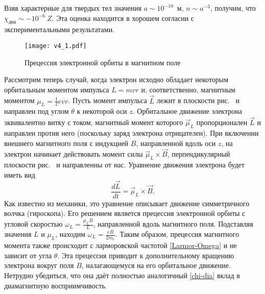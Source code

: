 Взяв характерные для твердых тел значения
$a \sim 10^{-10}$~м, $n\sim a^{-3}$, получим,
что $\chi_{диа} \sim -10^{-6}~Z$.
Эта оценка находится в хорошем согласии с экспериментальными результатами.

\begin{wrapfigure}[15]{r}{0.3\textwidth}
\centering
\texttt{[image: v4\_1.pdf]}
\caption{Прецессия электронной орбиты в магнитном поле}
\end{wrapfigure}

Рассмотрим теперь случай, когда электрон исходно обладает некоторым
орбитальным моментом импульса $L=mvr$ и, соответственно,
магнитным моментом $\mu_L= \frac12 e v r$.
Пусть момент импульса $\vec{L}$ лежит в плоскости
рис.~ и направлен под углом $\theta$ к некоторой оси $z$.
Орбитальное движение электрона эквивалентно витку с током,
магнитный момент которого $\vec{\mu}_L$ пропорционален $\vec{L}$
и направлен против него (поскольку заряд электрона отрицателен).
При включении внешнего магнитного поля с индукцией $B$,
направленной вдоль оси $z$, на электрон начинает
действовать момент силы $\vec{\mu}_L\times \vec{B}$,
перпендикулярный плоскости рис.~ и направленны от
нас. Уравнение движения электрона будет иметь вид
\begin{equation*}
	\frac{d\vec{L}}{dt} = \vec{\mu}_L\times \vec{B}.
\end{equation*}
Как известно из механики, это уравнение описывает движение симметричного волчка
(гироскопа). Его решением является
прецессия электронной орбиты с угловой скоростью
$\omega_{L} = \frac{\mu_L B}{L}$,
направленной вдоль магнитного поля.
Подставляя значения $L$ и $\mu_L$, находим
$\omega_L = \frac{eB}{2m_e}$.
Таким образом, прецессия магнитного момента также происходит с ларморовской частотой
\eqref{Larmor-Omega}
и не зависит от угла $\theta$. Эта прецессия приводит
к дополнительному вращению электрона вокруг поля $B$,
налагающемуся на его орбитальное движение. Нетрудно убедиться, что она
даёт полностью аналогичный \eqref{chi-dia} вклад в диамагнитную восприимчивость.


